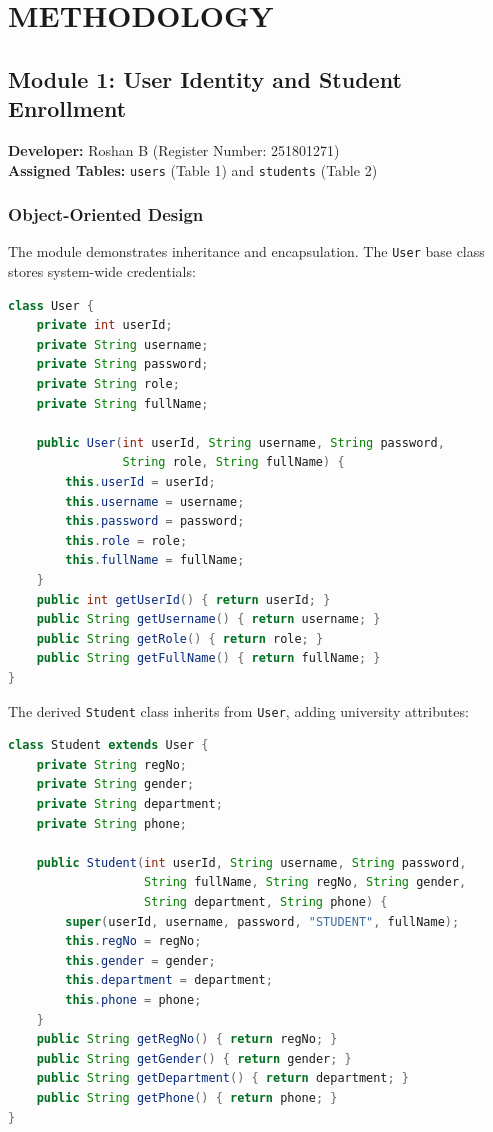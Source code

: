 \documentclass[12pt,a4paper]{report}
\begin{document}
\newpage

\chapter{METHODOLOGY}

\section{Module 1: User Identity and Student Enrollment}
\textbf{Developer:} Roshan B (Register Number: 251801271)\\
\textbf{Assigned Tables:} \texttt{users} (Table 1) and \texttt{students} (Table 2)

\subsection{Object-Oriented Design}
The module demonstrates inheritance and encapsulation. The \texttt{User} base class stores system-wide credentials:
\begin{lstlisting}[language=Java]
class User {
    private int userId;
    private String username;
    private String password;
    private String role;
    private String fullName;

    public User(int userId, String username, String password, 
                String role, String fullName) {
        this.userId = userId;
        this.username = username;
        this.password = password;
        this.role = role;
        this.fullName = fullName;
    }
    public int getUserId() { return userId; }
    public String getUsername() { return username; }
    public String getRole() { return role; }
    public String getFullName() { return fullName; }
}
\end{lstlisting}

The derived \texttt{Student} class inherits from \texttt{User}, adding university attributes:
\begin{lstlisting}[language=Java]
class Student extends User {
    private String regNo;
    private String gender;
    private String department;
    private String phone;

    public Student(int userId, String username, String password, 
                   String fullName, String regNo, String gender, 
                   String department, String phone) {
        super(userId, username, password, "STUDENT", fullName);
        this.regNo = regNo;
        this.gender = gender;
        this.department = department;
        this.phone = phone;
    }
    public String getRegNo() { return regNo; }
    public String getGender() { return gender; }
    public String getDepartment() { return department; }
    public String getPhone() { return phone; }
}
\end{lstlisting}
\end{document}
